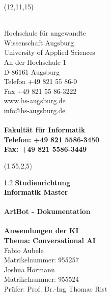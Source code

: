 \begin{textblock}{20}(12,11,15)
	\begin{flushleft}
		\noindent
		\footnotesize
			\textsf
			{
				\textcolor[rgb]{1,0,0.25}
				{\\
					Hochschule für angewandte\\
					Wissenschaft Augsburg\\
					University of Applied Sciences\\
					\vspace{6pt}
					An der Hochschule 1\\
					D-86161 Augsburg\\
					\vspace{6pt}
					Telefon +49 821 55 86-0\\
					Fax +49 821 55 86-3222\\
					www.hs-augsburg.de\\
					info@hs-augsburg.de\\
				}
			}	
			\textsf
			{
				\textbf
				{\\
					Fakultät für Informatik\\
					Telefon: +49 821 5586-3450\\
					Fax: \hspace{12.5pt} +49 821 5586-3449\\
				}			
			}	
	\end{flushleft}
\end{textblock}


\begin{textblock}{15}(1.55,2,5)
	\begin{flushleft}
		\begin{spacing} {1.2}
			\LARGE
				\textbf{Studienrichtung\\}
				\vspace{-5pt}
				\textbf{Informatik Master\\}
			\Huge
				\vspace{100pt}	
				\textcolor[rgb]{1,0.4,0}
				{\\
					\textbf{ArtBot - Dokumentation\\}
				}
				\vspace{-15pt}
			\Huge
				\textcolor[rgb]{1,0.4,0}
				{\\
					\textbf{Anwendungen der KI \\
						Thema: Conversational AI}\\
				}
				\vspace{180pt}
			\LARGE
				Fabio Aubele\\
				Matrikelnummer: 955257\\
				Joshua Hörmann\\
				Matrikelnummer: 955524\\
				Prüfer: Prof. Dr.-Ing Thomas Rist\\
			\end{spacing}
		\end{flushleft}
		
\end{textblock}

\pagebreak
